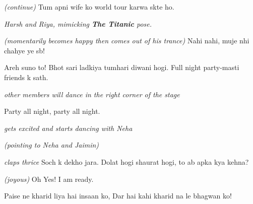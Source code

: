 \documentclass[12pt,a4paper,oneside]{memoir}
\begin{document}
\begin{description}[itemsep=1ex,leftmargin=1cm]
\item[BHARGAV] \textit{(continue)} Tum apni wife ko world tour karwa skte ho.

\textit{Harsh and Riya, mimicking \textbf{The Titanic} pose. }

\item[JAIMIN] \textit{(momentarily becomes happy then comes out of his trance)} Nahi nahi, muje nhi chahye ye sb!

\item[BHARGAV] Areh suno to! Bhot sari ladkiya tumhari diwani hogi. Full night party-masti friends k sath.

\textit{other members will dance in the right corner of the stage}

\item[OTHERS] Party all night, party all night.

\item[JAIMIN] \textit{gets excited and starts dancing with Neha}

\item[OTHERS] \textit{(pointing to Neha and Jaimin)}

\item[BHARGAV] \textit{claps thrice} Soch k dekho jara. Dolat hogi shaurat hogi, to ab apka kya kehna?

\item[JAIMIN] \textit{(joyous)} Oh Yes! I am ready.

\item[NEHA] Paise ne kharid liya hai insaan ko, Dar hai kahi kharid na le bhagwan ko!

\end{description}
\end{document}
